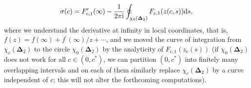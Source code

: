 \documentclass[10pt,a4paper]{amsart}
\numberwithin{equation}{section}
\newcommand{\ic}{\mathrm{i}}
\begin{document}
\begin{equation}
\label{expression sigma c}
\sigma(c) = F_{c,1}^\prime(\infty) - \frac1{2\pi\ic}\oint_{\chi_0(\boldsymbol\Delta_2)}F_{c,1}(z(c,s)){\rm d}s,
\end{equation}
where we understand the derivative at infinity in local coordinates, that is, $ f(z) = f(\infty) + f^\prime(\infty)/z + \cdots $, and we moved the curve of integration from $ \chi_c(\boldsymbol\Delta_2) $ to the circle $ \chi_0(\boldsymbol\Delta_2) $ by the analyticity of $ F_{c,1}(z_c(s)) $ (if $ \chi_0(\boldsymbol\Delta_2) $ does not work for all $ c\in(0,c^*) $, we can partition $ (0,c^*) $ into finitely many overlapping intervals and on each of them similarly replace $ \chi_c(\boldsymbol\Delta_2) $ by a curve independent of $ c $; this will not alter the forthcoming computations).
\end{document}
